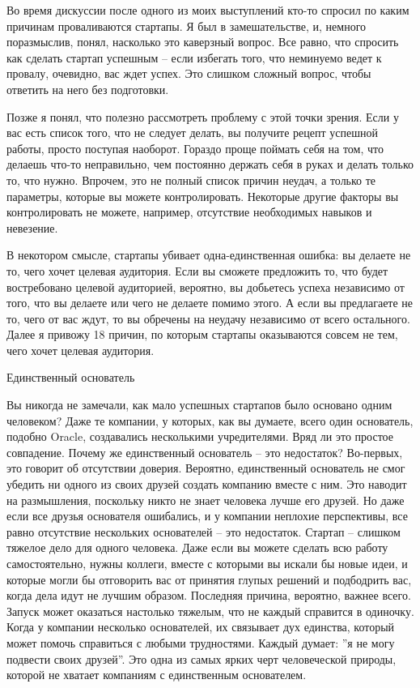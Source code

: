 \documentclass[ebook,12pt,oneside,openany]{memoir}
\begin{document}
\maketitle

Во время дискуссии после одного из моих выступлений кто-то спросил по
каким причинам проваливаются стартапы. Я был в замешательстве, и,
немного поразмыслив, понял, насколько это каверзный вопрос. Все равно,
что спросить как сделать стартап успешным – если избегать того, что
неминуемо ведет к провалу, очевидно, вас ждет успех. Это слишком
сложный вопрос, чтобы ответить на него без подготовки.

Позже я понял, что полезно рассмотреть проблему с этой точки зрения.
Если у вас есть список того, что не следует делать, вы получите рецепт
успешной работы, просто поступая наоборот. Гораздо проще поймать себя
на том, что делаешь что-то неправильно, чем постоянно держать себя в
руках и делать только то, что нужно. Впрочем, это не полный список
причин неудач, а только те параметры, которые вы можете
контролировать. Некоторые другие факторы вы контролировать не можете,
например, отсутствие необходимых навыков и невезение.

В некотором смысле, стартапы убивает одна-единственная ошибка: вы
делаете не то, чего хочет целевая аудитория. Если вы сможете
предложить то, что будет востребовано целевой аудиторией, вероятно, вы
добьетесь успеха независимо от того, что вы делаете или чего не
делаете помимо этого. А если вы предлагаете не то, чего от вас ждут,
то вы обречены на неудачу независимо от всего остального. Далее я
привожу 18 причин, по которым стартапы оказываются совсем не тем, чего
хочет целевая аудитория.

Единственный основатель

Вы никогда не замечали, как мало успешных стартапов было основано
одним человеком? Даже те компании, у которых, как вы думаете, всего
один основатель, подобно Oracle, создавались несколькими учредителями.
Вряд ли это простое совпадение. Почему же единственный основатель –
это недостаток? Во-первых, это говорит об отсутствии доверия.
Вероятно, единственный основатель не смог убедить ни одного из своих
друзей создать компанию вместе с ним. Это наводит на размышления,
поскольку никто не знает человека лучше его друзей. Но даже если все
друзья основателя ошибались, и у компании неплохие перспективы, все
равно отсутствие нескольких основателей – это недостаток. Стартап –
слишком тяжелое дело для одного человека. Даже если вы можете сделать
всю работу самостоятельно, нужны коллеги, вместе с которыми вы искали
бы новые идеи, и которые могли бы отговорить вас от принятия глупых
решений и подбодрить вас, когда дела идут не лучшим образом. Последняя
причина, вероятно, важнее всего. Запуск может оказаться настолько
тяжелым, что не каждый справится в одиночку. Когда у компании
несколько основателей, их связывает дух единства, который может помочь
справиться с любыми трудностями. Каждый думает: ”я не могу подвести
своих друзей”. Это одна из самых ярких черт человеческой природы,
которой не хватает компаниям с единственным основателем.
\end{document}
